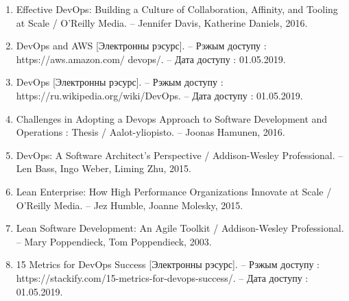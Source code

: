 

\begin{enumerate}[{label=\arabic{*}}]

    \item Effective DevOps:
          Building a Culture of Collaboration, Affinity,
          and Tooling at Scale / O'Reilly Media. –
          Jennifer Davis, Katherine Daniels, 2016.
        \label{book:Effective Devops}

    \item DevOps and AWS [Электронны рэсурс]. --
          Рэжым доступу : https://\-aws.amazon.com/ devops/. --
          Дата доступу : 01.05.2019.
        \label{site:aws.amazon.com/devops}

    \item DevOps [Электронны рэсурс]. --
          Рэжым доступу : https://ru.wikipedia.org/wiki/DevOps.\,\,--
          Дата доступу : 01.05.2019.
        \label{site:ru.wikipedia.org/wiki/devops}

    \item Challenges in Adopting a Devops Approach
          to Software Development and Operations : Thesis / 
          Aalot-yliopisto. -- Joonas Hamunen, 2016.
        \label{article:Challenges in Adopting a Devops}

    \item DevOps: A Software Architect's Perspective /
          Addison-Wesley Professional. --
          Len Bass, Ingo Weber, Liming Zhu, 2015.
        \label{book:DevOps: A Software Architect's Perspective}

    \item Lean Enterprise:
          How High Performance Organizations Innovate at Scale /
          O'Reilly Media. --
          Jez Humble, Joanne Molesky, 2015.
        \label{book:Lean Enterprise}
 
    \item Lean Software Development: An Agile Toolkit /
          Addison-Wesley Professional. --
          Mary Poppendieck, Tom Poppendieck, 2003.
        \label{book:Lean Software Development}

    \item 15 Metrics for DevOps Success [Электронны рэсурс]. -- 
          Рэжым доступу : \\
          https://stackify.com/15-metrics-for-devops-success/. --
          Дата доступу : 01.05.2019.
        \label{site:stackify.com/15-metrics}


\end{enumerate}
